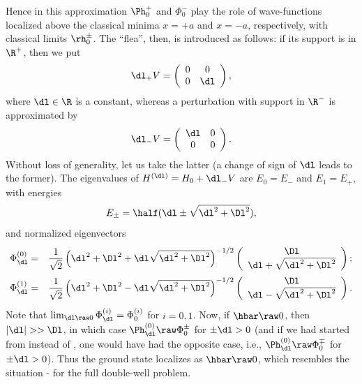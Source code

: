\documentclass[12pt]{article}
\begin{document}
Hence in this approximation $\Ph_0^+$ and $\Phi_0^-$ play the role of wave-functions   localized above the classical minima $x=+a$ and $x=-a$, respectively, with classical limits $\rh_0^{\pm}$. The ``flea'', then,  is introduced as follows: if its support is in $\R^+$, then we put
\begin{equation}
\dl_+ V=\left(
\begin{array}{cc}
0 & 0\\
 0 &  \dl
 \end{array}
\right), \label{PR}
\end{equation}
where $\dl\in\R$ is a constant, whereas a perturbation with support in $\R^-$ is approximated by
\begin{equation}
\dl_- V=\left(
\begin{array}{cc}
\dl & 0\\
 0 &   0
 \end{array}
\right).\label{PL}
\end{equation}
Without loss of generality, let us take the latter (a change of sign of $\dl$ leads to the former). The eigenvalues of $H^{(\dl)}=H_0+\dl_- V$ are
$E_0=E_-$ and $E_1=E_+$, with energies
\begin{equation}
E_{\pm}= \half(\dl\pm\sqrt{\dl^2+\Dl^2}), \label{Eplm}
\end{equation}
and normalized eigenvectors
\begin{eqnarray}
\Phi^{(0)}_{\dl} &=&\frac{1}{\sqrt{2}}\left(\dl^2+\Dl^2 +\dl\sqrt{\dl^2+\Dl^2}\right)^{-1/2}\left( \begin{array}{c}
\Dl \\
\dl+\sqrt{\dl^2+\Dl^2} \end{array} \right);\\
\Phi^{(1)}_{\dl} &= &
\frac{1}{\sqrt{2}}\left(\dl^2+\Dl^2 -\dl\sqrt{\dl^2+\Dl^2}\right)^{-1/2}\left( \begin{array}{c}
\Dl \\
\dl-\sqrt{\dl^2+\Dl^2} \end{array} \right).
\end{eqnarray}
Note that $\lim_{\dl\raw 0}\Phi^{(i)}_{\dl}=\Phi^{(i)}_0$ for $i=0,1$. 
Now, if $\hbar\raw 0$, then $|\dl|>>\Dl$, in which case  $\Ph^{(0)}_{\dl}\raw \Phi_0^{\pm}$ for  $\pm \dl>0$
(and if we had started from  instead of , one would have had the opposite case, i.e., $\Ph^{(0)}_{\dl}\raw \Phi_0^{\mp}$ for  $\pm \dl>0$).
Thus the ground state localizes as $\hbar\raw 0$, which  resembles the situation  -  for the full double-well problem. 
\end{document}
